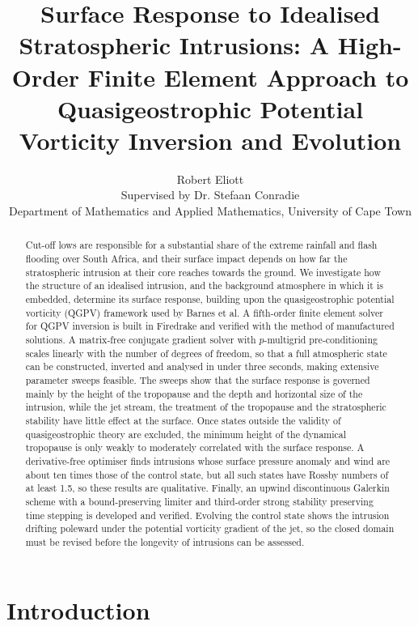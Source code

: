 \documentclass{article}
\title{Surface Response to Idealised Stratospheric Intrusions: A High-Order Finite Element Approach to Quasigeostrophic Potential Vorticity Inversion and Evolution}
\author{Robert Eliott\\[1ex]                                           
    \small Supervised by Dr. Stefaan Conradie\\                        
    \small Department of Mathematics and Applied Mathematics, University 
  of Cape Town}
\begin{document}
\maketitle

\begin{abstract}
    Cut-off lows are responsible for a substantial share of the extreme rainfall and flash flooding over South Africa, and their surface impact depends on how far the stratospheric intrusion at their core reaches towards the ground.
    We investigate how the structure of an idealised intrusion, and the background atmosphere in which it is embedded, determine its surface response, building upon the quasigeostrophic potential vorticity (QGPV) framework used by Barnes et al.
    A fifth-order finite element solver for QGPV inversion is built in Firedrake and verified with the method of manufactured solutions.
    A matrix-free conjugate gradient solver with $p$-multigrid pre-conditioning scales linearly with the number of degrees of freedom, so that a full atmospheric state can be constructed, inverted and analysed in under three seconds, making extensive parameter sweeps feasible.
    The sweeps show that the surface response is governed mainly by the height of the tropopause and the depth and horizontal size of the intrusion, while the jet stream, the treatment of the tropopause and the stratospheric stability have little effect at the surface.
    Once states outside the validity of quasigeostrophic theory are excluded, the minimum height of the dynamical tropopause is only weakly to moderately correlated with the surface response.
    A derivative-free optimiser finds intrusions whose surface pressure anomaly and wind are about ten times those of the control state, but all such states have Rossby numbers of at least 1.5, so these results are qualitative.
    Finally, an upwind discontinuous Galerkin scheme with a bound-preserving limiter and third-order strong stability preserving time stepping is developed and verified.
    Evolving the control state shows the intrusion drifting poleward under the potential vorticity gradient of the jet, so the closed domain must be revised before the longevity of intrusions can be assessed.
\end{abstract}

\setcounter{tocdepth}{2}
\tableofcontents

\section{Introduction}
\end{document}
